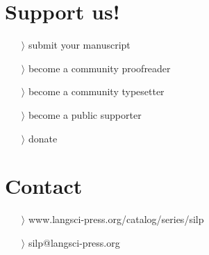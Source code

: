 \documentclass[
notumble,
nofoldmark,
]{leaflet}
\begin{document}
{{    \section{\color{LIGHTGRAY} \sffamily \Large Support us!}
	\begin{itemize}
	  \item[$\rangle$] submit your manuscript 
	  \item[$\rangle$] become a community proofreader 
	  \item[$\rangle$] become a community typesetter
	  \item[$\rangle$] become a public supporter
	  \item[$\rangle$] donate
	\end{itemize} 
    \section{\color{LIGHTGRAY} \sffamily \Large Contact} 
	\begin{itemize}
	  \item[$\rangle$] \sffamily www.langsci-press.org/catalog/series/silp
	  \item[$\rangle$]\sffamily  silp@langsci-press.org 
	\end{itemize} 
  }
}

\usebox{\pageone}

\newpage

\usebox{\pagetwo}

\newpage

\usebox{\pagetwo}

\newpage

\usebox{\pagetwo}

\newpage

\usebox{\pageone}

\newpage

\usebox{\pageone}
 

\loggingall
\end{document}
